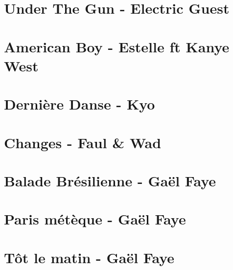 \documentclass[11pt]{article}
\begin{document}
\section{Under The Gun - Electric Guest}
\begin{guitar}

\end{guitar}


\section{American Boy - Estelle ft Kanye West}
\begin{guitar}

\end{guitar}

\section{Dernière Danse - Kyo}
\begin{guitar}

\end{guitar}


\section{Changes - Faul \& Wad}
\begin{guitar}

\end{guitar}

\section{Balade Brésilienne - Gaël Faye}
\begin{guitar}

\end{guitar}


\section{Paris métèque - Gaël Faye}
\begin{guitar}

\end{guitar}


\section{Tôt le matin - Gaël Faye}
\begin{guitar}

\end{guitar}
\end{document}
